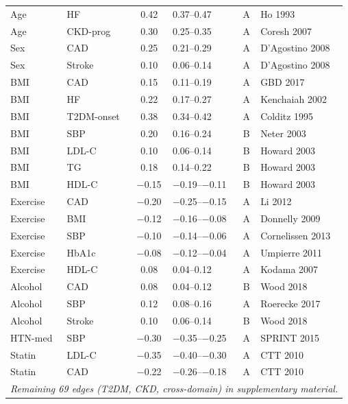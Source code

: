 \documentclass[runningheads]{llncs}
\begin{document}
{\begin{longtable}{@{}p{2.0cm}p{2.0cm}cp{1.4cm}cp{2.8cm}@{}}
Age & HF & 0.42 & 0.37--0.47 & A & Ho 1993 \\
Age & CKD-prog & 0.30 & 0.25--0.35 & A & Coresh 2007 \\
Sex & CAD & 0.25 & 0.21--0.29 & A & D'Agostino 2008 \\
Sex & Stroke & 0.10 & 0.06--0.14 & A & D'Agostino 2008 \\
BMI & CAD & 0.15 & 0.11--0.19 & A & GBD 2017 \\
BMI & HF & 0.22 & 0.17--0.27 & A & Kenchaiah 2002 \\
BMI & T2DM-onset & 0.38 & 0.34--0.42 & A & Colditz 1995 \\
BMI & SBP & 0.20 & 0.16--0.24 & B & Neter 2003 \\
BMI & LDL-C & 0.10 & 0.06--0.14 & B & Howard 2003 \\
BMI & TG & 0.18 & 0.14--0.22 & B & Howard 2003 \\
BMI & HDL-C & $-$0.15 & $-$0.19--$-$0.11 & B & Howard 2003 \\
Exercise & CAD & $-$0.20 & $-$0.25--$-$0.15 & A & Li 2012 \\
Exercise & BMI & $-$0.12 & $-$0.16--$-$0.08 & A & Donnelly 2009 \\
Exercise & SBP & $-$0.10 & $-$0.14--$-$0.06 & A & Cornelissen 2013 \\
Exercise & HbA1c & $-$0.08 & $-$0.12--$-$0.04 & A & Umpierre 2011 \\
Exercise & HDL-C & 0.08 & 0.04--0.12 & A & Kodama 2007 \\
Alcohol & CAD & 0.08 & 0.04--0.12 & B & Wood 2018 \\
Alcohol & SBP & 0.12 & 0.08--0.16 & A & Roerecke 2017 \\
Alcohol & Stroke & 0.10 & 0.06--0.14 & B & Wood 2018 \\
HTN-med & SBP & $-$0.30 & $-$0.35--$-$0.25 & A & SPRINT 2015 \\
Statin & LDL-C & $-$0.35 & $-$0.40--$-$0.30 & A & CTT 2010 \\
Statin & CAD & $-$0.22 & $-$0.26--$-$0.18 & A & CTT 2010 \\
\midrule
\multicolumn{6}{c}{\small\itshape Remaining 69 edges (T2DM, CKD, cross-domain) in supplementary material.} \\
\end{longtable}
}
\end{document}

